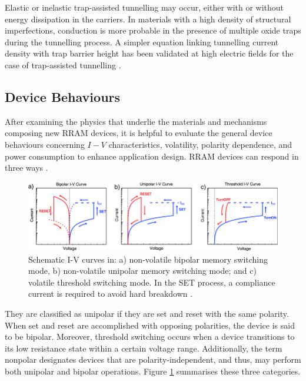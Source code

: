 \noindent Elastic or inelastic trap-assisted tunnelling may occur, either with or without energy dissipation in the carriers. In materials with a high density of structural imperfections, conduction is more probable in the presence of multiple oxide traps during the tunnelling process. A simpler equation linking tunnelling current density with trap barrier height has been validated at high electric fields for the case of trap-assisted tunnelling \cite{houng1999current}.

\subsection[Device Behaviours]{Device Behaviours}

After examining the physics that underlie the materials and mechanisms composing new RRAM devices, it is helpful to evaluate the general device behaviours concerning $I-V$ characteristics, volatility, polarity dependence, and power consumption to enhance application design. RRAM devices can respond in three ways \cite{li2017resistive}. \\

\begin{figure}[htbp!] 
\centering    
\includegraphics[width=1\textwidth]{Chapter1/Figs/1e.png}
\caption[Schematic I-V curves.]{Schematic I-V curves in: a) non-volatile bipolar memory switching mode, b) non-volatile unipolar memory switching mode; and c) volatile threshold switching mode. In the SET process, a compliance current is required to avoid hard breakdown \cite{li2017resistive}.}
\label{fig:1e}
\end{figure}

\noindent They are classified as unipolar if they are set and reset with the same polarity. When set and reset are accomplished with opposing polarities, the device is said to be bipolar. Moreover, threshold switching occurs when a device transitions to its low resistance state within a certain voltage range. Additionally, the term nonpolar designates devices that are polarity-independent, and thus, may perform both unipolar and bipolar operations. Figure \ref{fig:1e} summarises these three categories.

